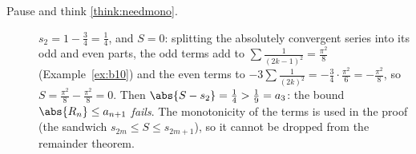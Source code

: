 \documentclass[11pt]{article}
\begin{document}
\begin{description}
  \item[Pause and think \ref{think:needmono}.] $s_2=1-\frac34=\frac14$, and $S=0$: splitting the absolutely convergent series into its odd and even parts, the odd terms add to $\sum\frac1{(2k-1)^2}=\frac{\pi^2}8$ (Example~\ref{ex:b10}) and the even terms to $-3\sum\frac1{(2k)^2}=-\frac34\cdot\frac{\pi^2}6=-\frac{\pi^2}8$, so $S=\frac{\pi^2}8-\frac{\pi^2}8=0$. Then $\abs{S-s_2}=\frac14>\frac19=a_3$: the bound $\abs{R_n}\le a_{n+1}$ \emph{fails}. The monotonicity of the terms is used in the proof (the sandwich $s_{2m}\le S\le s_{2m+1}$), so it cannot be dropped from the remainder theorem.
\end{description}
\end{document}
